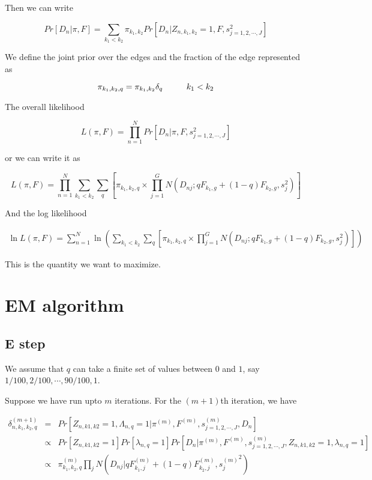 \documentclass[12pt]{article}
\begin{document}
Then we can write 


 $$ Pr \left [ D_{n} | \pi, F \right ] = \sum_{k_1 < k_2} \pi_{k_1, k_2} Pr \left [ D_{n} | Z_{n, k_1, k_2}=1, F, s^2_{j=1,2,\cdots,J} \right ] $$
 
We define the joint prior over the edges and the fraction of the edge represented as 

$$ \pi_{k_1,k_2, q} = \pi_{k_1, k_2} \delta_{q} \hspace{1 cm} k_1 < k_2 $$

The overall likelihood 

$$ L(\pi, F) = \prod_{n=1}^{N} Pr \left [ D_{n} | \pi, F, s^2_{j=1,2,\cdots,J} \right ] $$

or we can write it as 

$$L(\pi, F) = \prod_{n=1}^{N} \sum_{k_1 < k_2} \sum_{q} \left [ \pi_{k_1,k_2, q} \times \prod_{j=1}^{G} N \left (D_{nj}; q F_{k_1,g} + (1-q) F_{k_2, g}, s^2_{j} \right) \right ]  $$

And the log likelihood

\begin{eqnarray}
\ln {L (\pi, F)} = \sum_{n=1}^{N} \ln \left (\sum_{k_1 < k_2} \sum_{q} \left [ \pi_{k_1,k_2, q} \times \prod_{j=1}^{G} N \left (D_{nj}; q F_{k_1,g} + (1-q) F_{k_2, g}, s^2_{j} \right) \right ] \right )
\end{eqnarray}

This is the quantity we want to maximize. 

\section{EM algorithm}
\subsection{E step}

We assume that $q$ can take a finite set of values between $0$ and $1$, 
say $1/100, 2/100, \cdots, 90/100, 1$.

Suppose we have run upto $m$ iterations. For the $(m+1)$th iteration, we have 

\begin{eqnarray} \nonumber
\delta^{(m+1)}_{n, k_1, k_2, q} &=& Pr \left [ Z_{n, k1, k2} = 1, \Lambda_{n,q} = 1 | \pi^{(m)}, F^{(m)}, s^{(m)}_{j=1,2,\cdots,J}, D_{n} \right ] \\ \nonumber
 &\propto& Pr \left [ Z_{n, k1, k2} = 1 \right] Pr \left [ \lambda_{n,q} = 1 \right] Pr \left [ D_{n} | \pi^{(m)}, F^{(m)}, s^{(m)}_{j=1,2,\cdots,J}, Z_{n, k1, k2}= 1, \lambda_{n, q}=1 \right] \\ \nonumber
 &\propto& \pi^{(m)}_{k_1,k_2, q} \prod_{j} N \left (D_{nj} | qF^{(m)}_{k_1,j} + (1-q)F^{(m)}_{k_2,j}, {s_j^{(m)}}^2 \right) \\ \nonumber
\end{eqnarray}
\end{document}
